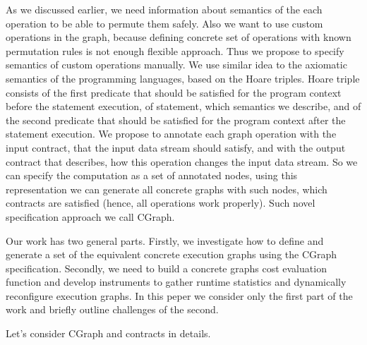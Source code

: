 As we discussed earlier, we need information about semantics of the each operation to be able to permute them safely.
Also we want to use custom operations in the graph, because defining concrete set of operations with known permutation rules is not enough flexible approach.
Thus we propose to specify semantics of custom operations manually.
We use similar idea to the axiomatic semantics of the programming languages, based on the Hoare triples.
Hoare triple consists of the first predicate that should be satisfied for the program context before the statement execution, of statement, which semantics we describe, and of the second predicate that should be satisfied for the program context after the statement execution.
We propose to annotate each graph operation with the input contract, that the input data stream should satisfy, and with the output contract that describes, how this operation changes the input data stream.
So we can specify the computation as a set of annotated nodes, using this representation we can generate all concrete graphs with such nodes, which contracts are satisfied (hence, all operations work properly).
Such novel specification approach we call CGraph.

Our work has two general parts.
Firstly, we investigate how to define and generate a set of the equivalent concrete execution graphs using the CGraph specification.
Secondly, we need to build a concrete graphs cost evaluation function and develop instruments to gather runtime statistics and dynamically reconfigure execution graphs. In this peper we consider only the first part of the work and briefly outline challenges of the second.

Let's consider CGraph and contracts in details.
